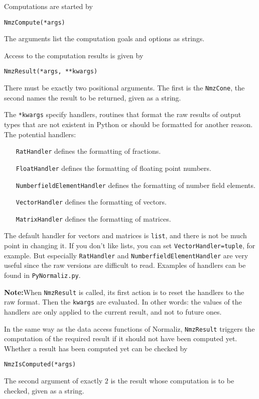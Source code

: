 \begin{small}
Computations are started by
\begin{Verbatim}
NmzCompute(*args)
\end{Verbatim}
The arguments list the computation goals and options as strings.

Access to the computation results is given by
\begin{Verbatim}
NmzResult(*args, **kwargs)
\end{Verbatim}
There must be exactly two positional arguments. The first is the \verb|NmzCone|, the second names the result to be returned, given as a string.

The \verb|*kwargs| specify handlers, routines that format the raw results of output types that are not existent in Python or should be formatted for another reason. The potential handlers:
\begin{itemize}
	\item[\texttt{RatHandler}] defines the formatting of fractions.
	
	\item[\texttt{FloatHandler}] defines the formatting of floating point numbers.
	
	\item[\texttt{NumberfieldElementHandler}] defines the formatting of number field elements.
	
	\item[\texttt{VectorHandler}] defines the formatting of vectors.
	
	\item[\texttt{MatrixHandler}] defines the formatting of matrices.
\end{itemize}

The default handler for vectors and matrices is \verb|list|, and there is not be much point in changing it. If you don't like lists, you can set \verb|VectorHandler=tuple|, for example. But especially \verb|RatHandler| and \verb|NumberfieldElementHandler| are very useful since the raw versions are difficult to read. Examples of handlers can be found in \verb|PyNormaliz.py|.

\textbf{Note:}\enspace When \verb|NmzResult| is called, its first action is to reset the handlers to the raw format. Then the \verb|kwargs| are evaluated. In other words: the values of the handlers are only applied to the current result, and not to future ones.

In the same way as the data access functions of Normaliz, \verb|NmzResult| triggers the computation of the required result if it should not have been computed yet. Whether a result has been computed yet can be checked by
\begin{Verbatim}
NmzIsComputed(*args)
\end{Verbatim}
The second argument of exactly $2$ is the result whose computation is to be checked, given as a string.


\end{small}
